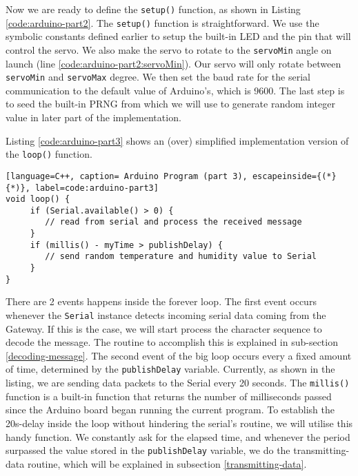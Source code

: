 Now we are ready to define the \texttt{setup()} function, as shown in Listing \ref{code:arduino-part2}. The \texttt{setup()} function is straightforward. We use the symbolic constants defined earlier to setup the built-in LED and the pin that will control the servo. We also make the servo to rotate to the \texttt{servoMin} angle on launch (line \ref{code:arduino-part2:servoMin}). Our servo will only rotate between \texttt{servoMin} and \texttt{servoMax} degree. We then set the baud rate for the serial communication to the default value of Arduino's, which is 9600. The last step is to seed the built-in PRNG from which we will use to generate random integer value in later part of the implementation.

Listing \ref{code:arduino-part3} shows an (over) simplified implementation version of the \texttt{loop()} function.
\begin{lstlisting}[language=C++, caption= Arduino Program (part 3), escapeinside={(*}{*)}, label=code:arduino-part3]
void loop() {
     if (Serial.available() > 0) {
        // read from serial and process the received message
     }
     if (millis() - myTime > publishDelay) {
        // send random temperature and humidity value to Serial
     }
}
\end{lstlisting}
There are 2 events happens inside the forever loop. The first event occurs whenever the \texttt{Serial} instance detects incoming serial data coming from the Gateway. If this is the case, we will start process the character sequence to decode the message. The routine to accomplish this is explained in sub-section \ref{decoding-message}. The second event of the big loop occurs every a fixed amount of time, determined by the \texttt{publishDelay} variable. Currently, as shown in the listing, we are sending data packets to the Serial every 20 seconds. The \texttt{millis()} function is a built-in function that returns the number of milliseconds passed since the Arduino board began running the current program. To establish the 20s-delay inside the loop without hindering the serial's routine, we will utilise this handy function. We constantly ask for the elapsed time, and whenever the period surpassed the value stored in the \texttt{publishDelay} variable, we do the transmitting-data routine, which will be explained in subsection \ref{transmitting-data}.
\clearpage

